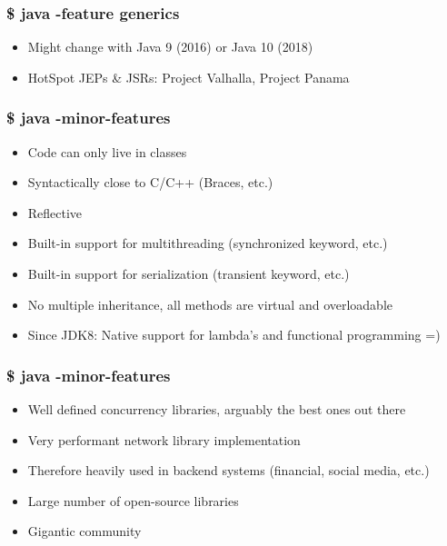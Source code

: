\begin{frame}
  \frametitle{\$ java -feature generics}
 \begin{itemize}
    \item Might change with Java 9 (2016) or Java 10 (2018)
    \vspace{0.4cm}
    \item HotSpot JEPs \& JSRs: Project Valhalla, Project Panama
  \end{itemize}  
\end{frame}


\begin{frame}
  \frametitle{\$ java -minor-features}

 \begin{itemize}
    \item Code can only live in classes
    \vspace{0.3cm}
    \item Syntactically close to C/C++ (Braces, etc.)
    \vspace{0.3cm}
    \item Reflective
    \vspace{0.3cm}
    \item Built-in support for multithreading (synchronized keyword, etc.)
    \vspace{0.3cm}
    \item Built-in support for serialization (transient keyword, etc.)
    \vspace{0.3cm}
    \item No multiple inheritance, all methods are virtual and overloadable
    \vspace{0.3cm}
    \item Since JDK8: Native support for lambda's and functional programming =)
  \end{itemize}  
  
\end{frame}


\begin{frame}
  \frametitle{\$ java -minor-features}

 \begin{itemize}
    \item Well defined concurrency libraries, arguably the best ones out there
    \vspace{0.3cm}
    \item Very performant network library implementation
    \vspace{0.3cm}  
    \item Therefore heavily used in backend systems (financial, social media, etc.)
    \vspace{0.3cm}
    \item Large number of open-source libraries
    \vspace{0.3cm}
    \item Gigantic community
  \end{itemize}  
  
\end{frame}


